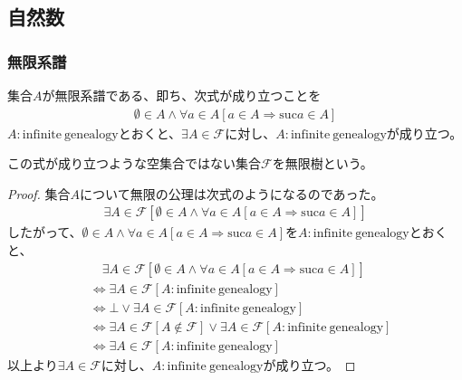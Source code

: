 \documentclass[dvipdfmx]{jsarticle}
\begin{document}
\subsection{自然数}%
\subsubsection{無限系譜}%
\begin{thm}\label{1.2.4.1}
集合$A$が無限系譜である、即ち、次式が成り立つことを
\begin{align*}
\emptyset \in A \land \forall a \in A\left[ a \in A \Rightarrow {\mathrm{suc} }a \in A \right]
\end{align*}
$A:\mathrm{infinite\ genealogy}$とおくと、$\exists A\in \mathcal{F}$に対し、$A:\mathrm{infinite\ genealogy}$が成り立つ。
\end{thm}
\begin{dfn}
この式が成り立つような空集合ではない集合$\mathcal{F}$を無限樹という。
\end{dfn}
\begin{proof}
集合$A$について無限の公理は次式のようになるのであった。
\begin{align*}
\exists A\in \mathcal{F}\left[ \emptyset \in A \land \forall a \in A\left[ a \in A \Rightarrow {\mathrm{suc} }a \in A \right] \right]
\end{align*}
したがって、$\emptyset \in A \land \forall a \in A\left[ a \in A \Rightarrow {\mathrm{suc} }a \in A \right]$を$A:\mathrm{infinite\ genealogy}$とおくと、
\begin{align*}
&\quad \exists A\in \mathcal{F}\left[ \emptyset \in A \land \forall a \in A\left[ a \in A \Rightarrow {\mathrm{suc} }a \in A \right] \right] \\ 
&\Leftrightarrow \exists A\in \mathcal{F}[ A:\mathrm{infinite\ genealogy}]\\
&\Leftrightarrow \bot \vee \exists A\in \mathcal{F}[ A:\mathrm{infinite\ genealogy}]\\
&\Leftrightarrow \exists A\in \mathcal{F}\left[ A\mathcal{\notin F} \right] \vee \exists A\in \mathcal{F}[ A:\mathrm{infinite\ genealogy}]\\
&\Leftrightarrow \exists A\in \mathcal{F}[ A:\mathrm{infinite\ genealogy}]
\end{align*}
以上より$\exists A\in \mathcal{F}$に対し、$A:\mathrm{infinite\ genealogy}$が成り立つ。
\end{proof}
\end{document}
